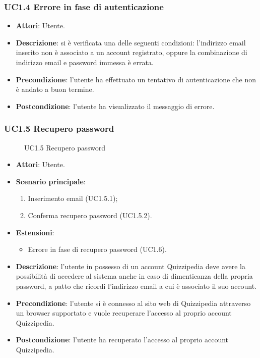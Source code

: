 \subsubsection{UC1.4 Errore in fase di autenticazione}
\begin{itemize}
\item \textbf{Attori}: Utente.
\item \textbf{Descrizione}: si è verificata una delle seguenti condizioni: l'indirizzo email inserito non è associato a un account registrato, oppure la combinazione di indirizzo email e password immessa è errata.
\item \textbf{Precondizione}: l'utente ha effettuato un tentativo di autenticazione che non è andato a buon termine.
\item \textbf{Postcondizione}: l'utente ha visualizzato il messaggio di errore.
\end{itemize}
\subsubsection{UC1.5 Recupero password}
\begin{figure}[H]
\centering
\noindent{}
\caption{UC1.5 Recupero password}
\end{figure}
\begin{itemize}
\item \textbf{Attori}: Utente.
\item \textbf{Scenario principale}:
\begin{enumerate}
\item Inserimento email (UC1.5.1);
\item Conferma recupero password (UC1.5.2).
\end{enumerate}
\item \textbf{Estensioni}:
\begin{itemize}
\item Errore in fase di recupero password (UC1.6).
\end{itemize}
\item \textbf{Descrizione}: l'utente in possesso di un account Quizzipedia deve avere la possibilità di accedere al sistema anche in caso di dimenticanza della propria password, a patto che ricordi l'indirizzo email a cui è associato il suo account.
\item \textbf{Precondizione}: l'utente si è connesso al sito web di Quizzipedia attraverso un browser supportato e vuole recuperare l'accesso al proprio account Quizzipedia.
\item \textbf{Postcondizione}: l'utente ha recuperato l'accesso al proprio account Quizzipedia.
\end{itemize}
